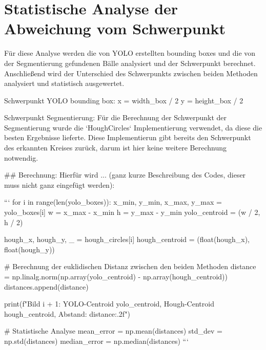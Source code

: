 \section{Statistische Analyse der Abweichung vom Schwerpunkt}

Für diese Analyse werden die von YOLO erstellten bounding boxes und die von der Segmentierung gefundenen Bälle analysiert und der Schwerpunkt berechnet. Anschließend wird der Unterschied des Schwerpunkts zwischen beiden Methoden analysiert und statistisch ausgewertet.

Schwerpunkt YOLO bounding box:
x = width_box / 2
y = height_box / 2


Schwerpunkt Segmentierung:
Für die Berechnung der Schwerpunkt der Segmentierung wurde die `HoughCircles` Implementierung verwendet, da diese die besten Ergebnisse lieferte. Diese Implementierun gibt bereits den Schwerpunkt des erkannten Kreises zurück, darum ist hier keine weitere Berechnung notwendig.


## Berechnung:
Hierfür wird ... (ganz kurze Beschreibung des Codes, dieser muss nicht ganz eingefügt werden):

```
for i in range(len(yolo_boxes)):
x_min, y_min, x_max, y_max = yolo_boxes[i]
w = x_max - x_min
h = y_max - y_min
yolo_centroid = (w / 2, h / 2)

hough_x, hough_y, _ = hough_circles[i]
hough_centroid = (float(hough_x), float(hough_y))

# Berechnung der euklidischen Distanz zwischen den beiden Methoden
distance = np.linalg.norm(np.array(yolo_centroid) - np.array(hough_centroid))
distances.append(distance)

print(f"Bild {i + 1}: YOLO-Centroid {yolo_centroid}, Hough-Centroid {hough_centroid}, Abstand: {distance:.2f}")

# Statistische Analyse
mean_error = np.mean(distances)
std_dev = np.std(distances)
median_error = np.median(distances)
```
